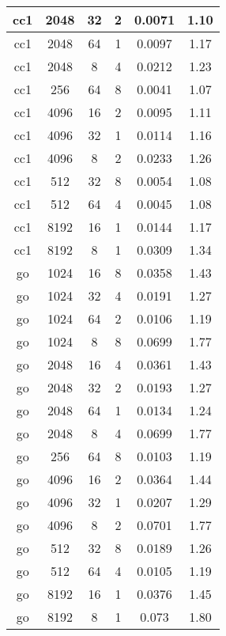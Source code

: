 \documentclass[12pt]{article}
\begin{document}
\begin{table}[!hbp]
{\begin{tabular}{|c|c|c|c|c|c|}
cc1 & 2048 & 32 & 2 & 0.0071 & 1.10 \\ \hline
cc1 & 2048 & 64 & 1 & 0.0097 & 1.17 \\ \hline
cc1 & 2048 & 8 & 4 & 0.0212 & 1.23 \\ \hline
cc1 & 256 & 64 & 8 & 0.0041 & 1.07 \\ \hline
cc1 & 4096 & 16 & 2 & 0.0095 & 1.11 \\ \hline
cc1 & 4096 & 32 & 1 & 0.0114 & 1.16 \\ \hline
cc1 & 4096 & 8 & 2 & 0.0233 & 1.26 \\ \hline
cc1 & 512 & 32 & 8 & 0.0054 & 1.08 \\ \hline
cc1 & 512 & 64 & 4 & 0.0045 & 1.08 \\ \hline
cc1 & 8192 & 16 & 1 & 0.0144 & 1.17 \\ \hline
cc1 & 8192 & 8 & 1 & 0.0309 & 1.34 \\ \hline
go & 1024 & 16 & 8 & 0.0358 & 1.43 \\ \hline
go & 1024 & 32 & 4 & 0.0191 & 1.27 \\ \hline
go & 1024 & 64 & 2 & 0.0106 & 1.19 \\ \hline
go & 1024 & 8 & 8 & 0.0699 & 1.77 \\ \hline
go & 2048 & 16 & 4 & 0.0361 & 1.43 \\ \hline
go & 2048 & 32 & 2 & 0.0193 & 1.27 \\ \hline
go & 2048 & 64 & 1 & 0.0134 & 1.24 \\ \hline
go & 2048 & 8 & 4 & 0.0699 & 1.77 \\ \hline
go & 256 & 64 & 8 & 0.0103 & 1.19 \\ \hline
go & 4096 & 16 & 2 & 0.0364 & 1.44 \\ \hline
go & 4096 & 32 & 1 & 0.0207 & 1.29 \\ \hline
go & 4096 & 8 & 2 & 0.0701 & 1.77 \\ \hline
go & 512 & 32 & 8 & 0.0189 & 1.26 \\ \hline
go & 512 & 64 & 4 & 0.0105 & 1.19 \\ \hline
go & 8192 & 16 & 1 & 0.0376 & 1.45 \\ \hline
go & 8192 & 8 & 1 & 0.073 & 1.80 \\ \hline


	\end{tabular} }
	\end{table}
\end{document}
